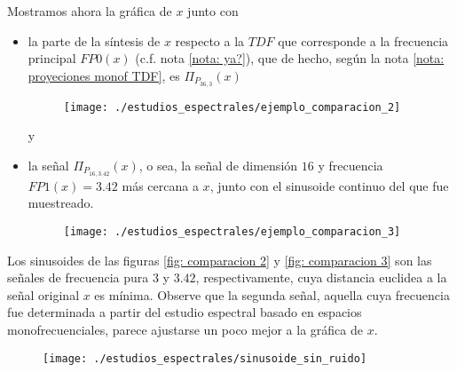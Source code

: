 \begin{ejemplo}
Mostramos ahora la gráfica de $x$ junto con
\begin{itemize}
	\item la parte de la síntesis de $x$ respecto a la $TDF$
	que corresponde a la frecuencia principal
	$FP0(x)$ (c.f.
	nota \ref{nota: ya?}), que de hecho,
	según la nota \ref{nota: proyeciones monof TDF}, es
	$\Pi_{P_{36,3}}(x)$
	\begin{figure}[H]
			\centering
			\texttt{[image: ./estudios\_espectrales/ejemplo\_comparacion\_2]} 
		\end{figure}		
	
	y
	\item la señal $\Pi_{P_{16, 3.42}}(x)$, o sea, la señal de
	dimensión $16$ y frecuencia $FP1(x)=3.42$ más cercana a $x$, junto con
	el sinusoide continuo del que fue muestreado.
	\begin{figure}[H]
			\centering
			\texttt{[image: ./estudios\_espectrales/ejemplo\_comparacion\_3]} 
		\end{figure}		
\end{itemize}


Los sinusoides de las figuras \ref{fig: comparacion 2} y
\ref{fig: comparacion 3}
son las señales de frecuencia pura
$3$ y $3.42$, respectivamente, cuya distancia euclidea
a la señal original $x$ es mínima. Observe que la segunda
señal, aquella cuya frecuencia
fue determinada
a partir del estudio espectral basado en espacios
monofrecuenciales,
parece ajustarse un poco mejor a la gráfica de $x$. \\

\begin{figure}[H]
			\centering
			\texttt{[image: ./estudios\_espectrales/sinusoide\_sin\_ruido]} 
		\end{figure}		




\end{ejemplo}
